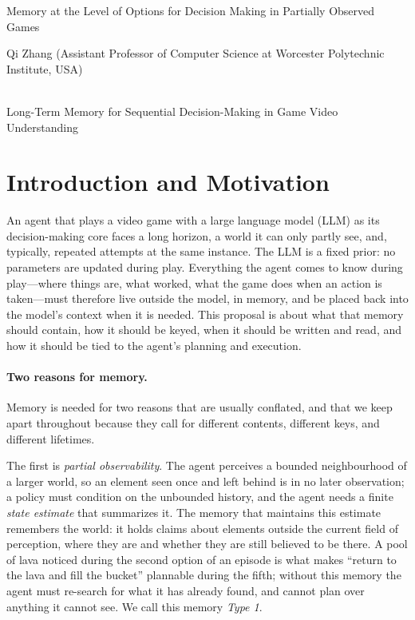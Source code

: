 \documentclass[10pt]{article}
\begin{document}
Memory at the Level of Options for Decision Making in Partially Observed Games

\medskip
{} Qi Zhang (Assistant Professor of Computer Science at Worcester Polytechnic Institute, USA)

\medskip
{}\\
Long-Term Memory for Sequential Decision-Making in Game Video Understanding

\medskip

\section{Introduction and Motivation}
\label{sec:intro}

An agent that plays a video game with a large language model (LLM) as its decision-making core faces a long horizon, a world it can only partly see, and, typically, repeated attempts at the same instance. The LLM is a fixed prior: no parameters are updated during play. Everything the agent comes to know during play---where things are, what worked, what the game does when an action is taken---must therefore live outside the model, in memory, and be placed back into the model's context when it is needed. This proposal is about what that memory should contain, how it should be keyed, when it should be written and read, and how it should be tied to the agent's planning and execution.

\paragraph{Two reasons for memory.}
Memory is needed for two reasons that are usually conflated, and that we keep apart throughout because they call for different contents, different keys, and different lifetimes.

The first is \emph{partial observability}. The agent perceives a bounded neighbourhood of a larger world, so an element seen once and left behind is in no later observation; a policy must condition on the unbounded history, and the agent needs a finite \emph{state estimate} that summarizes it. The memory that maintains this estimate remembers the world: it holds claims about elements outside the current field of perception, where they are and whether they are still believed to be there. A pool of lava noticed during the second option of an episode is what makes ``return to the lava and fill the bucket'' plannable during the fifth; without this memory the agent must re-search for what it has already found, and cannot plan over anything it cannot see. We call this memory \emph{Type 1}.
\end{document}

